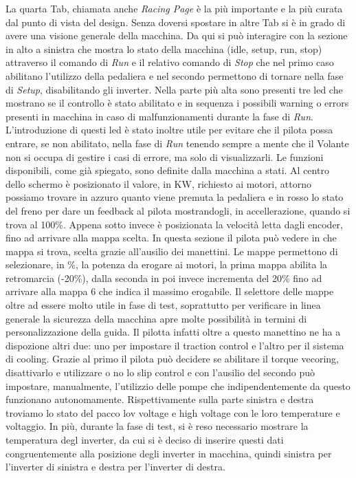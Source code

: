 La quarta Tab, chiamata anche \emph{Racing Page} è la più importante e la più curata dal punto di vista del design.
Senza doversi spostare in altre Tab si è in grado di avere una visione generale della macchina.
Da qui si può interagire con la sezione in alto a sinistra che mostra lo stato della macchina (idle, setup, run, stop)
attraverso il comando di \emph{Run} e il relativo comando di \emph{Stop} che nel primo caso abilitano l'utilizzo della pedaliera
e nel secondo permettono di tornare nella fase di \emph{Setup}, disabilitando gli inverter.
Nella parte più alta sono presenti tre led che mostrano se il controllo è stato abilitato e in sequenza 
i possibili warning o errors presenti in macchina in caso di malfunzionamenti durante la fase di \emph{Run}.
L'introduzione di questi led è stato inoltre utile per evitare che il pilota possa entrare, se non abilitato, nella fase di \emph{Run}
tenendo sempre a mente che il Volante non si occupa di gestire i casi di errore, ma solo di visualizzarli.
Le funzioni disponibili, come già spiegato, sono definite dalla macchina a stati.
Al centro dello schermo è posizionato il valore, in KW, richiesto ai motori, 
attorno possiamo trovare in azzuro quanto viene premuta la pedaliera e in rosso lo stato del freno per dare un feedback al pilota 
mostrandogli, in accellerazione, quando si trova al 100\%.
Appena sotto invece è posizionata la velocità letta dagli encoder, fino ad arrivare alla mappa scelta.
In questa sezione il pilota può vedere in che mappa si trova, scelta grazie all'ausilio dei manettini.
Le mappe permettono di selezionare, in \%, la potenza da erogare ai motori, la prima mappa abilita la retromarcia (-20\%), 
dalla seconda in poi invece incrementa del 20\% fino ad arrivare alla mappa 6 che indica il massimo erogabile.  
Il selettore delle mappe oltre ad essere molto utile in fase di test, soprattutto per verificare in linea generale la sicurezza della macchina 
apre molte possibilità in termini di personalizzazione della guida. 
Il pilotta infatti oltre a questo manettino ne ha a dispozione altri due: uno per impostare il traction control e l'altro per il sistema di cooling. 
Grazie al primo il pilota può decidere se abilitare il torque vecoring, disattivarlo e utilizzare o no lo slip control e con l'ausilio del secondo
può impostare, manualmente, l'utilizzio delle pompe che indipendentemente da questo funzionano autonomamente.    
Rispettivamente sulla parte sinistra e destra troviamo lo stato del pacco lov voltage e high voltage con le loro temperature e voltaggio.
In più, durante la fase di test, si è reso necessario mostrare la temperatura degl inverter, da cui si è deciso di inserire questi dati 
congruentemente alla posizione degli inverter in macchina, quindi sinistra per l'inverter di sinistra e destra per l'inverter di destra.

